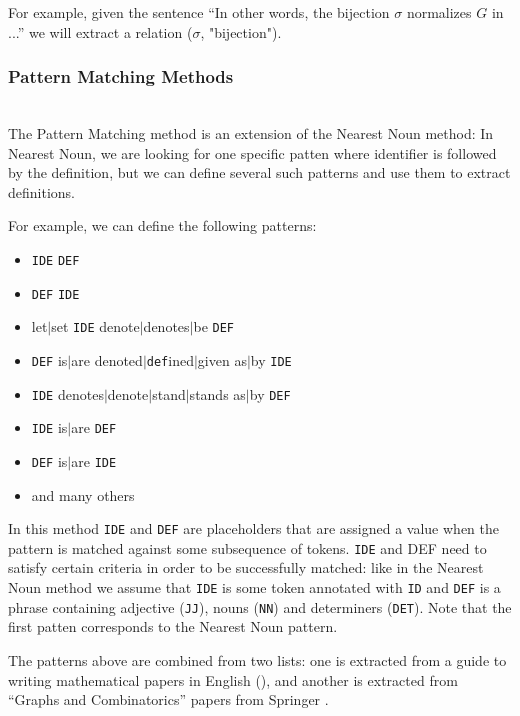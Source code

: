 For example, given the sentence ``In other words, the bijection $\sigma$ normalizes
$G$ in ...'' we will extract a relation ($\sigma$, "bijection").



\subsubsection{Pattern Matching Methods} \label{sec:pattern-matching} \ \\

The Pattern Matching method \cite{quoc2010mining} is an extension of the
Nearest Noun method: In Nearest Noun, we are looking for one specific patten
where identifier is followed by the definition, but we can define several such
patterns and use them to extract definitions.

For example, we can define the following patterns:

\begin{itemize}
\itemsep1pt\parskip0pt
  \item \texttt{IDE} \texttt{DEF}
  \item \texttt{DEF} \texttt{IDE}
  \item let$|$set \texttt{IDE} denote$|$denotes$|$be \texttt{DEF}
  \item \texttt{DEF} is$|$are denoted$|$\texttt{def}ined$|$given as$|$by \texttt{IDE}
  \item \texttt{IDE} denotes$|$denote$|$stand$|$stands as$|$by \texttt{DEF}
  \item \texttt{IDE} is$|$are \texttt{DEF}
  \item \texttt{DEF} is$|$are \texttt{IDE}
  \item and many others
\end{itemize}


In this method \texttt{IDE} and \texttt{DEF} are placeholders that are
assigned a value when the pattern is matched against some subsequence
of tokens.  \texttt{IDE} and DEF need to
satisfy certain criteria in order to be successfully matched: like in the
Nearest Noun method we assume that \texttt{IDE} is some token annotated with
\texttt{ID} and \texttt{DEF} is a phrase containing adjective (\texttt{JJ}),
nouns (\texttt{NN}) and  determiners (\texttt{DET}). Note that the first patten corresponds
to the Nearest Noun pattern.

The patterns above are combined from two lists: one is extracted from a
guide to writing mathematical papers in English (\cite{trzeciak1995writing}),
and another is extracted from ``Graphs and Combinatorics'' papers from Springer
\cite{kristianto2012extracting}.

